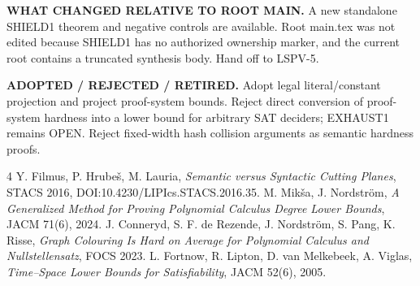 \documentclass[11pt]{article}
\begin{document}
\noindent\textbf{WHAT CHANGED RELATIVE TO ROOT MAIN.}
A new standalone SHIELD1 theorem and negative controls
are available. Root main.tex was not edited because SHIELD1
has no authorized ownership marker, and the current root
contains a truncated synthesis body. Hand off to LSPV-5.

\noindent\textbf{ADOPTED / REJECTED / RETIRED.}
Adopt legal literal/constant projection and project
proof-system bounds. Reject direct conversion of
proof-system hardness into a lower bound for arbitrary
SAT deciders; EXHAUST1 remains OPEN. Reject fixed-width
hash collision arguments as semantic hardness proofs.

\begin{thebibliography}{4}
 Y. Filmus, P. Hrube\v{s}, M. Lauria,
\emph{Semantic versus Syntactic Cutting Planes},
STACS 2016, DOI:10.4230/LIPIcs.STACS.2016.35.
 M. Mik\v{s}a, J. Nordstr\"om,
\emph{A Generalized Method for Proving Polynomial
Calculus Degree Lower Bounds}, JACM 71(6), 2024.
 J. Conneryd, S. F. de Rezende,
J. Nordstr\"om, S. Pang, K. Risse,
\emph{Graph Colouring Is Hard on Average for
Polynomial Calculus and Nullstellensatz}, FOCS 2023.
 L. Fortnow, R. Lipton, D. van Melkebeek,
A. Viglas, \emph{Time--Space Lower Bounds for
Satisfiability}, JACM 52(6), 2005.
\end{thebibliography}
\end{document}
